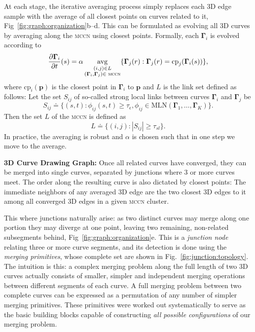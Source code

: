 \documentclass[a4paper,titlepage]{article}
\newcommand{\Gama}{\boldsymbol{\Gamma}}
\newcommand{\mccn}{\textsc{mccn}\xspace}
\newcommand{\avg}{\operatornamewithlimits{avg}}
\begin{document}
At each stage, the iterative averaging process simply replaces each 3D edge
sample with the average of all closest points on curves related to it,
Fig~\ref{fig:graph:organization}b--d. This can be formulated
as evolving all 3D curves by averaging along the \mccn using closest points.
Formally, each $\Gama_i$ is evolved according to
\begin{equation}
\frac{\partial\Gama_i}{\partial t}(s) = \alpha 
\avg_{\substack{(i,j)\in L\\ (\Gama_i, \Gama_j) \in \text{ \textsc{mccn}}}}
\{\Gama_j(r) : \Gama_j(r) = \text{cp}_j(\Gama_i(s)) \},
\end{equation}%
where $\text{cp}_i(\mathbf p)$ is the closest point in $\Gama_i$ to $\mathbf p$ and $L$ is the link set defined as follows:
Let the set $S_{ij}$ of so-called strong local links between curves $\Gama_i$ and
$\Gama_j$ be
\begin{equation}
S_{ij} \doteq \{(s,t) : \phi_{ij}(s,t) \geq \tau_{\epsilon}, \phi_{ij} \in
\text{MLN}(\Gama_1,\dots,\Gama_K) \}.
\end{equation}
Then the set $L$ of the \mccn is defined as
\begin{equation}
L \doteq \{(i,j) : |S_{ij}| \geq \tau_{sl}\}.
\end{equation}
In practice, the averaging is robust and $\alpha$ is chosen such that in
one step we move to the average.

\textbf{3D Curve Drawing Graph:}
Once all related curves have converged, they can be merged into single curves,
separated by junctions where 3 or more curves meet. The order along the
resulting curve is also dictated by closest points: The immediate neighbors of
any averaged 3D edge are the two closest 3D edges to it among all
converged 3D edges in a given \mccn cluster.

This where junctions naturally arise: as two distinct curves may merge along one
portion they may diverge at one point, leaving two remaining, non-related
subsegments behind, Fig~\ref{fig:graph:organization}e.  This is a \emph{junction
node} relating three or more curve segments, and its detection is done using the
\emph{merging primitives}, whose complete set are shown in
Fig.~\ref{fig:junction:topology}. The intuition is this: a
complex merging problem along the full length of two 3D curves actually consists
of smaller, simpler and independent merging operations between different
segments of each curve. A full merging problem between two complete
curves can be expressed as a permutation of any number of simpler merging
primitives. These primitives were worked out systematically to serve as the
basic building blocks capable of constructing \emph{all possible configurations}
of our merging problem. 
\end{document}
